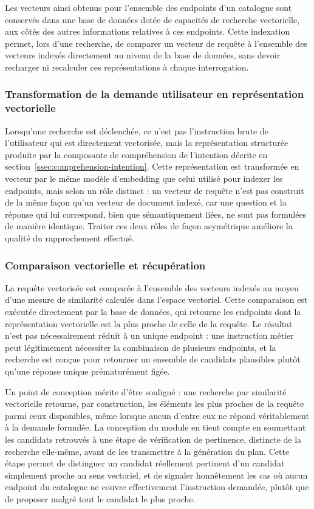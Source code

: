 Les vecteurs ainsi obtenus pour l'ensemble des endpoints d'un catalogue sont conservés dans une base de données dotée de capacités de recherche vectorielle, aux côtés des autres informations relatives à ces endpoints. Cette indexation permet, lors d'une recherche, de comparer un vecteur de requête à l'ensemble des vecteurs indexés directement au niveau de la base de données, sans devoir recharger ni recalculer ces représentations à chaque interrogation.

\subsubsection{Transformation de la demande utilisateur en représentation vectorielle}

Lorsqu'une recherche est déclenchée, ce n'est pas l'instruction brute de l'utilisateur qui est directement vectorisée, mais la représentation structurée produite par la composante de compréhension de l'intention décrite en section~\ref{ssec:comprehension-intention}. Cette représentation est transformée en vecteur par le même modèle d'embedding que celui utilisé pour indexer les endpoints, mais selon un rôle distinct : un vecteur de requête n'est pas construit de la même façon qu'un vecteur de document indexé, car une question et la réponse qui lui correspond, bien que sémantiquement liées, ne sont pas formulées de manière identique. Traiter ces deux rôles de façon asymétrique améliore la qualité du rapprochement effectué.

\subsubsection{Comparaison vectorielle et récupération}

La requête vectorisée est comparée à l'ensemble des vecteurs indexés au moyen d'une mesure de similarité calculée dans l'espace vectoriel. Cette comparaison est exécutée directement par la base de données, qui retourne les endpoints dont la représentation vectorielle est la plus proche de celle de la requête. Le résultat n'est pas nécessairement réduit à un unique endpoint : une instruction métier peut légitimement nécessiter la combinaison de plusieurs endpoints, et la recherche est conçue pour retourner un ensemble de candidats plausibles plutôt qu'une réponse unique prématurément figée.

Un point de conception mérite d'être souligné : une recherche par similarité vectorielle retourne, par construction, les éléments les plus proches de la requête parmi ceux disponibles, même lorsque aucun d'entre eux ne répond véritablement à la demande formulée. La conception du module en tient compte en soumettant les candidats retrouvés à une étape de vérification de pertinence, distincte de la recherche elle-même, avant de les transmettre à la génération du plan. Cette étape permet de distinguer un candidat réellement pertinent d'un candidat simplement proche au sens vectoriel, et de signaler honnêtement les cas où aucun endpoint du catalogue ne couvre effectivement l'instruction demandée, plutôt que de proposer malgré tout le candidat le plus proche.

